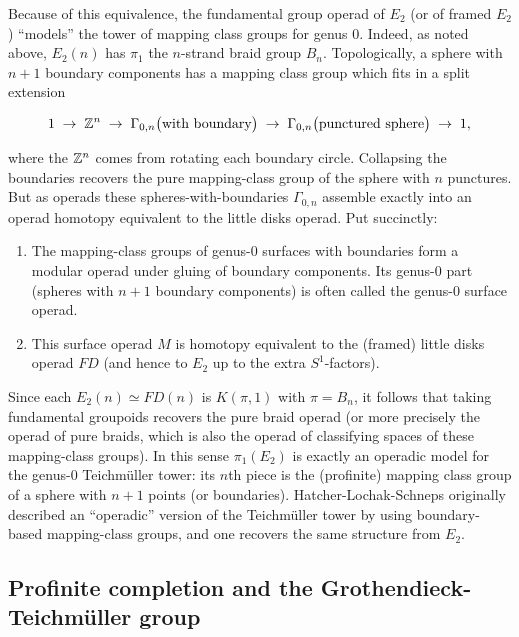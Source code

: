 Because of this equivalence, the fundamental group operad of $E_2$ (or of framed $E_2$) “models” the tower of mapping class groups for genus 0.  Indeed, as noted above, $E_2(n)$ has $\pi_1$ the $n$-strand braid group $B_n$.  Topologically, a sphere with $n+1$ boundary components has a mapping class group which fits in a split extension

$$
  1 \;\to\; \mathbb{Z}^n \;\to\; \Gamma_{0,n}\bigl(\text{with boundary}\bigr) \;\to\; \Gamma_{0,n}\bigl(\text{punctured sphere}\bigr)\;\to\;1,
$$

where the $\mathbb{Z}^n$ comes from rotating each boundary circle.  Collapsing the boundaries recovers the pure mapping-class group of the sphere with $n$ punctures.  But as operads these spheres-with-boundaries ${\Gamma_{0,n}}$ assemble exactly into an operad homotopy equivalent to the little disks operad.  Put succinctly:

\begin{enumerate}
    \item The mapping-class groups of genus-0 surfaces with boundaries form a modular operad under gluing of boundary components.  Its genus-0 part (spheres with $n+1$ boundary components) is often called the genus-0 surface operad.
    \item This surface operad $M$ is homotopy equivalent to the (framed) little disks operad $FD$ (and hence to $E_2$ up to the extra $S^1$-factors).
\end{enumerate}

Since each $E_2(n)\simeq FD(n)$ is $K(\pi,1)$ with $\pi=B_n$, it follows that taking fundamental groupoids recovers the pure braid operad (or more precisely the operad of pure braids, which is also the operad of classifying spaces of these mapping-class groups).  In this sense $\pi_1(E_2)$ is exactly an operadic model for the genus-0 Teichm\"uller tower: its $n$th piece is the (profinite) mapping class group of a sphere with $n+1$ points (or boundaries).  Hatcher-Lochak-Schneps originally described an “operadic” version of the Teichm\"uller tower by using boundary-based mapping-class groups, and one recovers the same structure from $E_2$.

\subsection{Profinite completion and the Grothendieck-Teichm\"uller group}

